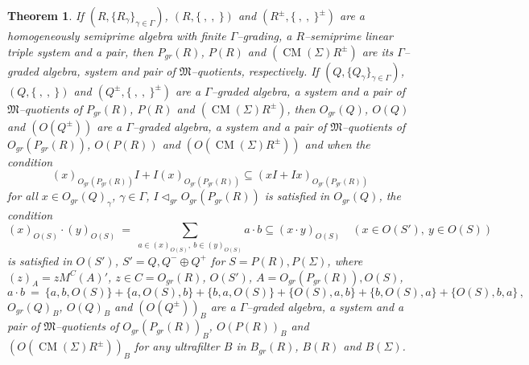 \documentclass[a4paper,11pt]{article}
\newtheorem{teor}[defi]{Theorem}
\DeclareMathOperator{\CM}{CM}
\begin{document}
\begin{teor}
If $(R, \{R_{\gamma}\}_{\gamma\in \Gamma})$, $(R, \{\ ,\ ,\ \})$ and 
$(R^{\pm}, \{\ ,\ ,\ \}^{\pm})$ are a homogeneously semi\-prime algebra with 
finite $\Gamma$--grading, a $R$--semiprime linear triple system and a pair, 
then $P_{gr}(R)$, $P(R)$ and $(\CM(\Sigma) R^{\pm})$ are its $\Gamma$--graded 
algebra, system and pair of $\mathfrak{M}$--quotients, respectively.
If $(Q, \{Q_{\gamma}\}_{\gamma\in \Gamma})$, $(Q, \{\ ,\ ,\ \})$ and 
$(Q^{\pm}, \{\ ,\ ,\ \}^{\pm})$ are a $\Gamma$--graded algebra, a system 
and a pair of $\mathfrak{M}$--quotients of $P_{gr}(R)$, $P(R)$ and 
$(\CM(\Sigma) R^{\pm})$, then $O_{gr}(Q)$, $O(Q)$ and $(O(Q^{\pm}))$ are a 
$\Gamma$--graded algebra, a system and a pair of $\mathfrak{M}$--quotients of 
$O_{gr}(P_{gr}(R))$, $O(P(R))$ and $(O(\CM(\Sigma) R^{\pm}))$ and when the 
condition 
\begin{equation}
(x)_{O_{gr}(P_{gr}(R))} I+I (x)_{O_{gr}(P_{gr}(R))}\subseteq 
(x I+I x)_{O_{gr}(P_{gr}(R))}
\end{equation}
for all ${x\in O_{gr}(Q)_{\gamma}}$, ${\gamma\in \Gamma}$, 
${I\lhd_{gr} O_{gr}(P_{gr}(R))}$ is satisfied in $O_{gr}(Q)$,  
the condition  
\begin{equation}
(x)_{O(S)}\cdot (y)_{O(S)}\ =\ \sum_{a\in (x)_{O(S)},\ b\in (y)_{O(S)}} 
a\cdot b\subseteq (x\cdot y)_{O(S)}\quad (x\in O(S'),\ y\in O(S))
\end{equation}
is satisfied in $O(S')$, ${S'=Q, Q^{-}\oplus Q^{+}}$ for ${S=P(R), P(\Sigma)}$, 
where ${(z)_A=z M^C(A)'}$, $z\in C=O_{gr}(R)$, $O(S')$, 
${A=O_{gr}(P_{gr}(R)), O(S)}$, 
\[
a\cdot b\ =\ \{a, b, O(S)\}+\{a, O(S), b\}+\{b, a, O(S)\}+\{O(S), a, b\}+
\{b, O(S), a\}+\{O(S), b, a\}\,,
\]
$O_{gr}(Q)_B$, $O(Q)_B$ and $(O(Q^{\pm}))_B$ are a $\Gamma$--graded algebra, 
a system and a pair of $\mathfrak{M}$--quotients of $O_{gr}(P_{gr}(R))_B$, 
$O(P(R))_B$ and $(O(\CM(\Sigma) R^{\pm}))_B$ for any ultrafilter $B$ in  
$B_{gr}(R)$, $B(R)$ and $B(\Sigma)$. 
\end{teor}
\end{document}
